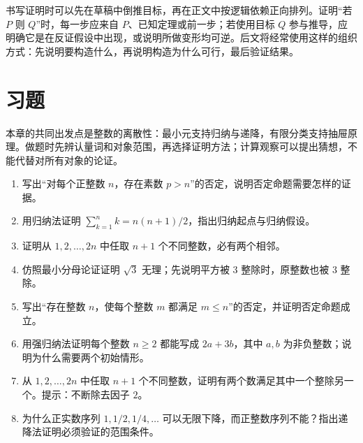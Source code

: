 书写证明时可以先在草稿中倒推目标，再在正文中按逻辑依赖正向排列。证明“若 $P$ 则 $Q$”时，每一步应来自 $P$、已知定理或前一步；若使用目标 $Q$ 参与推导，应明确它是在反证假设中出现，或说明所做变形均可逆。后文将经常使用这样的组织方式：先说明要构造什么，再说明构造为什么可行，最后验证结果。

\section{习题}

本章的共同出发点是整数的离散性：最小元支持归纳与递降，有限分类支持抽屉原理。做题时先辨认量词和对象范围，再选择证明方法；计算观察可以提出猜想，不能代替对所有对象的论证。

\begin{enumerate}
  \item 写出“对每个正整数 $n$，存在素数 $p>n$”的否定，说明否定命题需要怎样的证据。
  \item 用归纳法证明 $\sum_{k=1}^n k=n(n+1)/2$，指出归纳起点与归纳假设。
  \item 证明从 $1,2,\ldots,2n$ 中任取 $n+1$ 个不同整数，必有两个相邻。
  \item 仿照最小分母论证证明 $\sqrt3$ 无理；先说明平方被 $3$ 整除时，原整数也被 $3$ 整除。
 \item\label{ex:intro-negation} 写出“存在整数 $n$，使每个整数 $m$ 都满足 $m\le n$”的否定，并证明否定命题成立。
 \item\label{ex:intro-strong} 用强归纳法证明每个整数 $n\ge2$ 都能写成 $2a+3b$，其中 $a,b$ 为非负整数；说明为什么需要两个初始情形。
 \item\label{ex:intro-dividing-pair} 从 $1,2,\ldots,2n$ 中任取 $n+1$ 个不同整数，证明有两个数满足其中一个整除另一个。提示：不断除去因子 $2$。
 \item\label{ex:intro-descent-domain} 为什么正实数序列 $1,1/2,1/4,\ldots$ 可以无限下降，而正整数序列不能？指出递降法证明必须验证的范围条件。
\end{enumerate}

